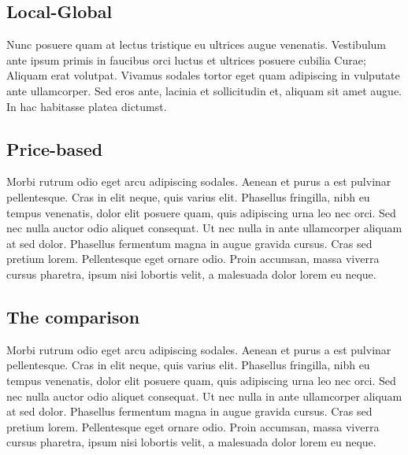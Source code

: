\subsection{Local-Global}

Nunc posuere quam at lectus tristique eu ultrices augue venenatis. Vestibulum ante ipsum primis in faucibus orci luctus et ultrices posuere cubilia Curae; Aliquam erat volutpat. Vivamus sodales tortor eget quam adipiscing in vulputate ante ullamcorper. Sed eros ante, lacinia et sollicitudin et, aliquam sit amet augue. In hac habitasse platea dictumst.


\subsection{Price-based}
Morbi rutrum odio eget arcu adipiscing sodales. Aenean et purus a est pulvinar pellentesque. Cras in elit neque, quis varius elit. Phasellus fringilla, nibh eu tempus venenatis, dolor elit posuere quam, quis adipiscing urna leo nec orci. Sed nec nulla auctor odio aliquet consequat. Ut nec nulla in ante ullamcorper aliquam at sed dolor. Phasellus fermentum magna in augue gravida cursus. Cras sed pretium lorem. Pellentesque eget ornare odio. Proin accumsan, massa viverra cursus pharetra, ipsum nisi lobortis velit, a malesuada dolor lorem eu neque.


\subsection{The comparison}
Morbi rutrum odio eget arcu adipiscing sodales. Aenean et purus a est pulvinar pellentesque. Cras in elit neque, quis varius elit. Phasellus fringilla, nibh eu tempus venenatis, dolor elit posuere quam, quis adipiscing urna leo nec orci. Sed nec nulla auctor odio aliquet consequat. Ut nec nulla in ante ullamcorper aliquam at sed dolor. Phasellus fermentum magna in augue gravida cursus. Cras sed pretium lorem. Pellentesque eget ornare odio. Proin accumsan, massa viverra cursus pharetra, ipsum nisi lobortis velit, a malesuada dolor lorem eu neque.